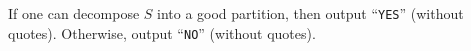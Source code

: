 If one can decompose $S$ into a good partition, then output ``\verb+YES+''
(without quotes). Otherwise, output ``\verb+NO+'' (without quotes).
